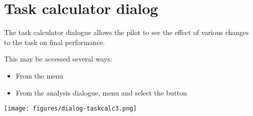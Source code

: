 




\section{Task calculator dialog}\label{sec:task-calc-dial}
The task calculator dialogue allows the pilot to see the effect of
various changes to the task on final performance.

This may be accessed several ways: 
\begin{itemize}
\item From the menu 
\begin{quote}
\blink{}
\end{quote}
\item From the analysis dialogue, menu \blink{} and select
 the button 
\end{itemize}

\begin{center}
\texttt{[image: figures/dialog-taskcalc3.png]}
\end{center}

